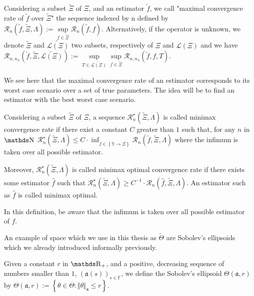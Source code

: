 \begin{de}\label{DE_INTRO_FREQ_DECISION_MINIMAXOPT_MAXRATE}
Considering a subset $\widetilde{\Xi}$ of $\Xi$, and an estimator $\widetilde{f}$, we call "maximal convergence rate of $\widetilde{f}$ over $\widetilde{\Xi}$" the sequence indexed by n defined by $\mathcal{R}_{n}(\widetilde{f}, \widetilde{\Xi}, \Lambda) := \sup\limits_{f \in \widetilde{\Xi}} \mathcal{R}_{n}(\widetilde{f}, f).$
Alternatively, if the operator is unknown, we denote $\widetilde{\Xi}$ and $\widetilde{\mathcal{L}(\Xi)}$ two subsets, respectively of $\Xi$ and $\mathcal{L}(\Xi)$ and we have $\mathcal{R}_{n, n_{\lambda}}(\widetilde{f}, \widetilde{\Xi}, \widetilde{\mathcal{L}(\Xi)}) := \sup\limits_{T \in \widetilde{\mathcal{L}(\Xi)}} \sup\limits_{f \in \widetilde{\Xi}} \mathcal{R}_{n, n_{\lambda}}(\widetilde{f}, f, T)$.
\assEnd
\end{de}
We see here that the maximal convergence rate of an estimator corresponds to its worst case scenario over a set of true parameters.
The idea will be to find an estimator with the best worst case scenario.

\begin{de}\label{DE_INTRO_FREQ_DECISION_MINIMAXOPT_OPTRATE}
Considering a subset $\widetilde{\Xi}$ of $\Xi$, a sequence $\mathcal{R}_{n}^{\star}(\widetilde{\Xi}, \Lambda)$ is called minimax convergence rate if there exist a constant $C$ greater than $1$ such that, for any $n$ in $\N$ 
$\mathcal{R}_{n}^{\star}(\widetilde{\Xi}, \Lambda) \leq C \cdot \inf\nolimits_{\widetilde{f} \in \left\{\mathds{Y} \rightarrow \Xi \right\}} \mathcal{R}_{n}(\widetilde{f}, \widetilde{\Xi}, \Lambda)$ where the infimum is taken over all possible estimator.

Moreover, $\mathcal{R}_{n}^{\star}(\widetilde{\Xi}, \Lambda)$ is called minimax optimal convergence rate if there exists some estimator $\widehat{f}$ such that $\mathcal{R}_{n}^{\star}(\widetilde{\Xi}, \Lambda) \geq C^{-1} \cdot \mathcal{R}_{n}(\widehat{f}, \widetilde{\Xi}, \Lambda).$
An estimator such as $\widehat{f}$ is called minimax optimal.
\assEnd
\end{de}
In this definition, be aware that the infimum is taken over all possible estimator of $f$.

An example of space which we use in this thesis as $\widetilde{\Theta}$ are Sobolev's ellipsoids which we already introduced informally previously.
\begin{de}\label{DE_INTRO_FREQ_DECISION_MINIMAXOPT_SOBOL}
Given a constant $r$ in $\R_{+}$, and a positive, decreasing sequence of numbers smaller than $1$, $\left(\mathfrak{a}(s)\right)_{s \in \mathds{F}}$, we define the Sobolev's ellipsoid $\Theta(\mathfrak{a}, r)$ by $\Theta(\mathfrak{a}, r) := \left\{\theta \in \Theta: \Vert \theta \Vert_{\mathfrak{a}} \leq r \right\}$.
\assEnd
\end{de}

